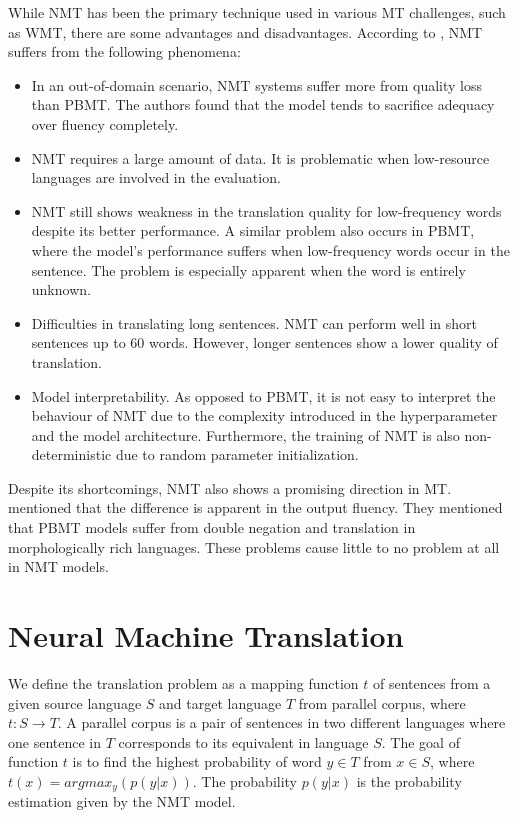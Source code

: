 While NMT has been the primary technique used in various MT challenges, such as WMT, there are some advantages and disadvantages. According to \cite{koehn2017nmt}, NMT suffers from the following phenomena:
\begin{itemize}
    \item In an out-of-domain scenario, NMT systems suffer more from quality loss than PBMT. The authors found that the model tends to sacrifice adequacy over fluency completely.

    \item NMT requires a large amount of data. It is problematic when low-resource languages are involved in the evaluation.

    \item NMT still shows weakness in the translation quality for low-frequency words despite its better performance. A similar problem also occurs in PBMT, where the model's performance suffers when low-frequency words occur in the sentence. The problem is especially apparent when the word is entirely unknown.

    \item Difficulties in translating long sentences. NMT can perform well in short sentences up to 60 words. However, longer sentences show a lower quality of translation.

    \item Model interpretability. As opposed to PBMT, it is not easy to interpret the behaviour of NMT due to the complexity introduced in the hyperparameter and the model architecture. Furthermore, the training of NMT is also non-deterministic due to random parameter initialization.
\end{itemize}

Despite its shortcomings, NMT also shows a promising direction in MT. \cite{machavcek2018enriching} mentioned that the difference is apparent in the output fluency. They mentioned that PBMT models suffer from double negation and translation in morphologically rich languages. These problems cause little to no problem at all in NMT models.

\section{Neural Machine Translation}
\label{sec:bm_nmt}
We define the translation problem as a mapping function $t$ of sentences from a given source language $S$ and target language $T$ from parallel corpus, where $t : S \rightarrow T$. A parallel corpus is a pair of sentences in two different languages where one sentence in $T$ corresponds to its equivalent in language $S$. The goal of function $t$ is to find the highest probability of word $y \in T$ from $x \in S$, where $t(x) = argmax_y(p(y|x))$. The probability $p(y|x)$ is the probability estimation given by the NMT model.

